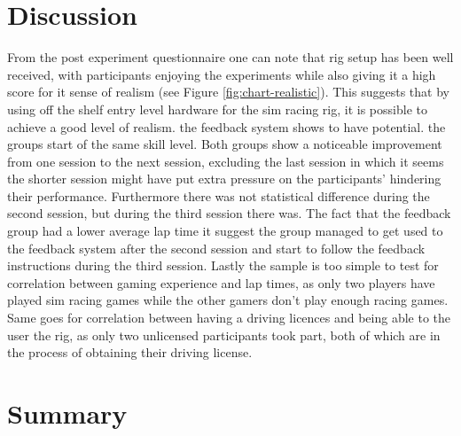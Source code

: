 \section{Discussion}
\label{sec:eval-Discussion}
From the post experiment questionnaire one can note that rig setup has been well received, with participants enjoying the experiments while also giving it a high score for it sense of realism (see Figure \ref{fig:chart-realistic}). This suggests that by using off the shelf entry level hardware for the sim racing rig, it is possible to achieve a good level of realism. the feedback system shows to have potential. the groups start of the same skill level. Both groups show a noticeable improvement from one session to the next session, excluding the last session in which it seems the shorter session might have put extra pressure on the participants' hindering their performance. Furthermore there was not statistical difference during the second session, but during the third session there was. The fact that the feedback group had a lower average lap time it suggest the group managed to get used to the feedback system after the second session and start to follow the feedback instructions during the third session. Lastly the sample is too simple to test for correlation between gaming experience and lap times, as only two players have played sim racing games while the other gamers don't play enough racing games. Same goes for correlation between having a driving licences and being able to the user the rig, as only two unlicensed participants took part, both of which are in the process of obtaining their driving license.

\section{Summary}
